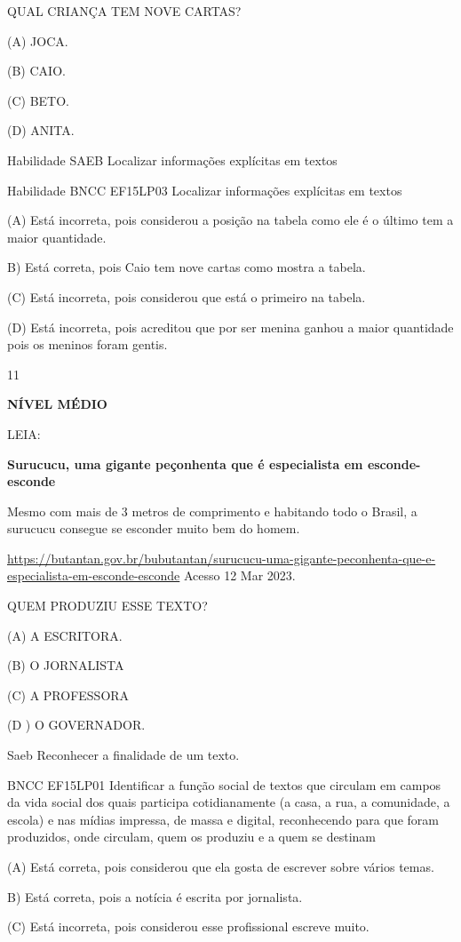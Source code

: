 {{QUAL CRIANÇA TEM NOVE CARTAS?

(A) JOCA.

(B) CAIO.

(C) BETO.

(D) ANITA.

Habilidade SAEB Localizar informações explícitas em textos

Habilidade BNCC EF15LP03 Localizar informações explícitas em textos

(A) Está incorreta, pois considerou a posição na tabela como ele é o
último tem a maior quantidade.

B) Está correta, pois Caio tem nove cartas como mostra a tabela.

(C) Está incorreta, pois considerou que está o primeiro na tabela.

(D) Está incorreta, pois acreditou que por ser menina ganhou a maior
quantidade pois os meninos foram gentis.

\num{11}

\textbf{NÍVEL MÉDIO}

LEIA:

\textbf{Surucucu, uma gigante peçonhenta que é especialista em
esconde-esconde}

Mesmo com mais de 3 metros de comprimento e habitando todo o Brasil, a
surucucu consegue se esconder muito bem do homem.

\url{https://butantan.gov.br/bubutantan/surucucu-uma-gigante-peconhenta-que-e-especialista-em-esconde-esconde}
Acesso 12 Mar 2023.

QUEM PRODUZIU ESSE TEXTO?

(A) A ESCRITORA.

(B) O JORNALISTA

(C) A PROFESSORA

(D ) O GOVERNADOR.

Saeb Reconhecer a finalidade de um texto.

BNCC EF15LP01 Identificar a função social de textos que circulam em
campos da vida social dos quais participa cotidianamente (a casa, a rua,
a comunidade, a escola) e nas mídias impressa, de massa e digital,
reconhecendo para que foram produzidos, onde circulam, quem os produziu
e a quem se destinam

(A) Está correta, pois considerou que ela gosta de escrever sobre vários
temas.

B) Está correta, pois a notícia é escrita por jornalista.

(C) Está incorreta, pois considerou esse profissional escreve muito.

}}
